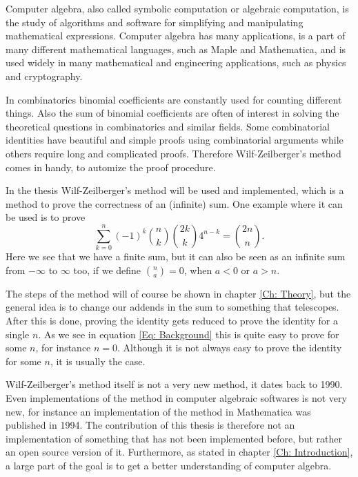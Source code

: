 Computer algebra, also called symbolic computation or algebraic computation, is the study of algorithms and software for simplifying and manipulating mathematical expressions. Computer algebra has many applications, is a part of many different mathematical languages, such as Maple and Mathematica, and is used widely in many mathematical and engineering applications, such as physics and cryptography.

In combinatorics binomial coefficients are constantly used for counting different things. Also the sum of binomial coefficients are often of interest in solving the theoretical questions in combinatorics and similar fields. Some combinatorial identities have beautiful and simple proofs using combinatorial arguments while others require long and complicated proofs. Therefore Wilf-Zeilberger's method comes in handy, to automize the proof procedure.

In the thesis Wilf-Zeilberger's method will be used and implemented, which is a method to prove the correctness of an (infinite) sum. One example where it can be used is to prove
\begin{equation}\label{Eq: Background}
  \sum_{k=0}^n (-1)^k\binom{n}{k}\binom{2k}{k}4^{n-k}=\binom{2n}{n}.
\end{equation}
Here we see that we have a finite sum, but it can also be seen as an infinite sum from $-\infty$ to $\infty$ too, if we define $\binom{n}{a}=0$, when $a<0$ or $a>n$.

The steps of the method will of course be shown in chapter \ref{Ch: Theory}, but the general idea is to change our addends in the sum to something that telescopes. After this is done, proving the identity gets reduced to prove the identity for a single $n$. As we see in equation \ref{Eq: Background} this is quite easy to prove for some $n$, for instance $n=0$. Although it is not always easy to prove the identity for some $n$, it is usually the case.

Wilf-Zeilberger's method itself is not a very new method, it dates back to 1990. Even implementations of the method in computer algebraic softwares is not very new, for instance an implementation of the method in Mathematica was published in 1994. The contribution of this thesis is therefore not an implementation of something that has not been implemented before, but rather an open source version of it. Furthermore, as stated in chapter \ref{Ch: Introduction}, a large part of the goal is to get a better understanding of computer algebra.
